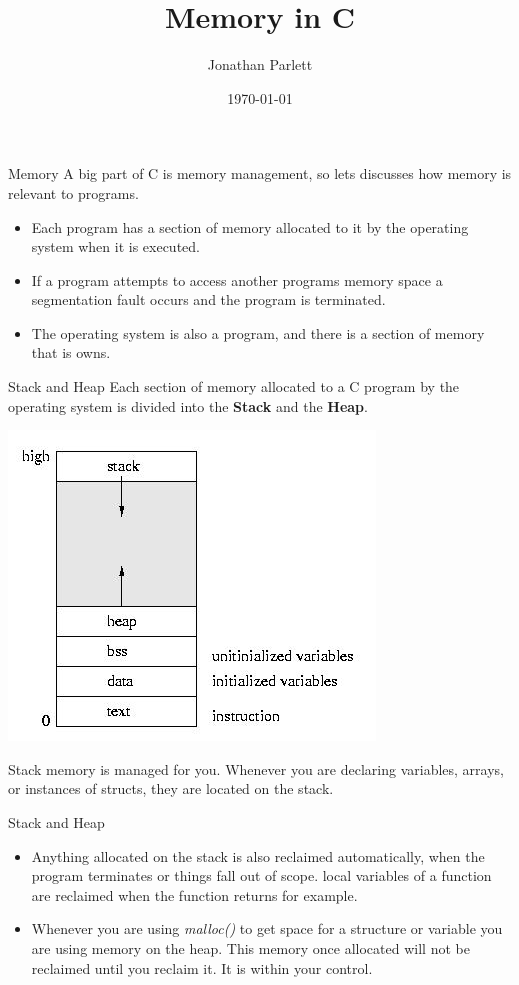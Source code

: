 \documentclass{beamer}
\title{Memory in C}
\author{Jonathan Parlett}
\date{\today}
\begin{document}
\begin{frame}
    \titlepage
\end{frame}

\begin{frame}{Memory}
	A big part of C is memory management, so lets discusses how memory is relevant to programs.

	\begin{itemize}
		\item Each program has a section of memory allocated to it by the operating system when it is executed. 
		\item If a program attempts to access another programs memory space a segmentation fault occurs and the program is terminated.
		\item The operating system is also a program, and there is a section of memory that is owns.
	\end{itemize}
\end{frame}

\begin{frame}{Stack and Heap}
	Each section of memory allocated to a C program by the operating system is divided into the {\bf Stack} and the {\bf Heap}.

	\includegraphics[scale=0.40]{imgs/stackandheap.jpeg}

	Stack memory is managed for you. Whenever you are declaring variables, arrays, or instances of structs, they are located on the stack.
\end{frame}

\begin{frame}{Stack and Heap}
	\begin{itemize}
	\item Anything allocated on the stack is also reclaimed automatically, when the program terminates or things fall out of scope. local variables of a function are reclaimed when the function returns for example.

	\item Whenever you are using {\it malloc()} to get space for a structure or variable you are using memory on the heap. This memory once allocated will not be reclaimed until you reclaim it. It is within your control.
	\end{itemize}
\end{frame}
\end{document}
